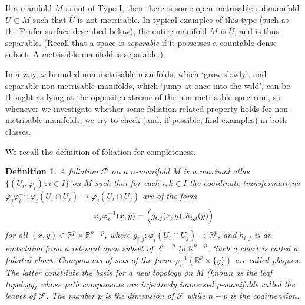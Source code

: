 \documentclass{amsart}
\newtheorem{defn}[theorem]{Definition}
\begin{document}
If a manifold $M$ is not of Type I, then there is some open metrisable submanifold $U\subset M$ such that ${\overline{{U}}}$ is not metrisable.
In typical examples of this type (such as the Pr\"ufer surface described below), the entire manifold $M$ is ${\overline{{U}}}$, and is thus
separable. (Recall that a space is {\em separable} if it possesses a countable dense subset. A metrisable manifold is separable.)

In a way, $\omega$-bounded non-metrisable manifolds, which `grow slowly', and separable non-metrisable manifolds, which
`jump at once into the wild',  can be thought as lying at the 
opposite extreme of
the non-metrisable spectrum,
so whenever we investigate whether some foliation-related property holds for non-metrisable manifolds, 
we try to check (and, if possible, find examples) in both classes.

We recall the definition of foliation for completeness.

\begin{defn}
  A foliation $\mathcal{F}$ on a $n$-manifold $M$ is a maximal atlas 
  $\{(U_i,\varphi_i)\,:i\in I\}$ on $M$ such that for each $i,k\in I$ the coordinate transformations 
  $\varphi_j\varphi_i^{-1}:\varphi_i(U_i\cap U_j)\to \varphi_j(U_i\cap U_j)$
  are of the form
  $$
    \varphi_j\varphi_i^{-1}(x,y)=\Bigl( g_{i,j}(x,y),h_{i,j}(y)\Bigr)
  $$
  for all $(x,y)\in{\mathbb R}^p\times{\mathbb R}^{n-p}$, where $g_{i,j}:\varphi_i(U_i\cap U_j)\to{\mathbb R}^p$, and $h_{i,j}$ is an embedding from a relevant
  open subset of ${\mathbb R}^{n-p}$ to ${\mathbb R}^{n-p}$. Such a chart is called a foliated chart. Components of sets of the form 
  $\varphi_i^{-1}({\mathbb R}^p\times\{y\})$ are called plaques.
  The latter constitute the basis for a new topology on $M$ (known as the leaf topology) whose path
  components are injectively immersed $p$-manifolds called the leaves of $\mathcal{F}$. 
  The number $p$ is the dimension of $\mathcal{F}$ while $n-p$ is the codimension.
\end{defn}
\fi 
\end{document}
